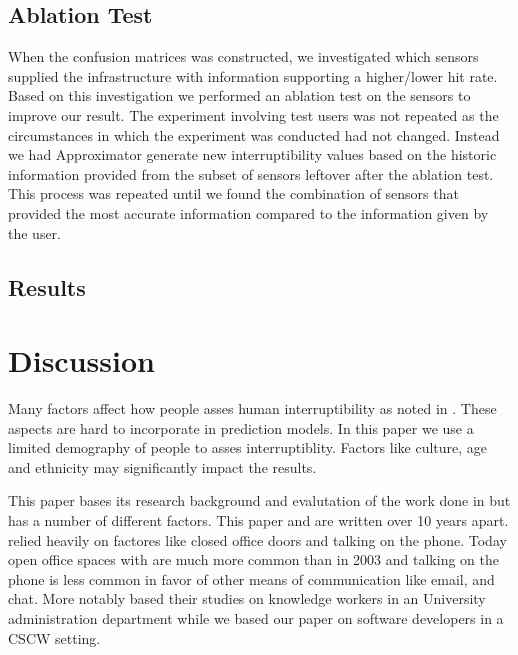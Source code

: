 \documentclass{sigchi}
\begin{document}
\subsection{Ablation Test}
When the confusion matrices was constructed, we investigated which sensors supplied the infrastructure with information supporting a higher/lower hit rate.
Based on this investigation we performed an ablation test on the sensors to improve our result.
The experiment involving test users was not repeated as the circumstances in which the experiment was conducted had not changed.
Instead we had Approximator generate new interruptibility values based on the historic information provided from the subset of sensors leftover after the ablation test.
This process was repeated until we found the combination of sensors that provided the most accurate information compared to the information given by the user.

\subsection{Results}

\section{Discussion}


Many factors affect how people asses human interruptibility as noted in \cite{Avrahami2007}.
These aspects are hard to incorporate in prediction models.
In this paper we use a limited demography of people to asses interruptiblity.
Factors like culture, age and ethnicity may significantly impact the results.

This paper bases its research background and evalutation of the work done in \cite{fogarty2005predicting} but has a number of different factors. This paper and \cite{fogarty2005predicting} are written over 10 years apart. \cite{fogarty2005predicting} relied heavily on factores like closed office doors and talking on the phone. Today open office spaces with are much more common than in 2003 and talking on the phone is less common in favor of other means of communication like email, and chat. More notably \cite{fogarty2005predicting} based their studies on knowledge workers in an University administration department while we based our paper on software developers in a CSCW setting.
\end{document}
